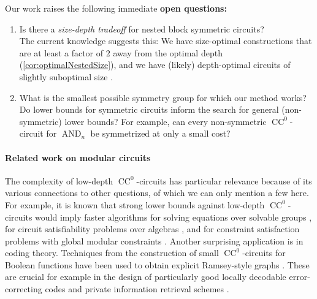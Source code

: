 \documentclass[11pt]{article}
\DeclareMathOperator{\AND}{AND}
\theoremstyle{definition}
\theoremstyle{plain}
\theoremstyle{remark}
\theoremstyle{remark}
\DeclareMathOperator{\CC}{CC}
\begin{document}
Our work raises the following immediate \textbf{open questions:}\\
\vspace*{-1em}
\begin{enumerate}
	\item Is there a \emph{size-depth tradeoff} for nested block symmetric circuits?\\ The current knowledge suggests this: We have size-optimal constructions that are at least a factor of $2$ away from the optimal depth (\cref{cor:optimalNestedSize}), and we have (likely) depth-optimal circuits of slightly suboptimal size \cite[Proposition 4.3]{IdziakKK22LICS}.
	\item What is the smallest possible symmetry group for which our method works? Do lower bounds for symmetric circuits inform the search for general (non-symmetric) lower bounds? For example, can every non-symmetric $\CC^0$-circuit for $\AND_n$ be symmetrized at only a small cost?
\end{enumerate}	





 







\paragraph*{Related work on modular circuits }
The complexity of low-depth $\CC^0$-circuits has particular relevance because of its various connections to other questions, of which we can only mention a few here.
For example, it is known that strong lower bounds against low-depth $\CC^0$-circuits would imply faster algorithms for solving equations over solvable groups \cite{IdziakKKW22-icalp}, for circuit satisfiability problems over algebras \cite{IdziakKK20, IdziakKK25}, and for constraint satisfaction problems with global modular constraints \cite{brakensiek2022}.
Another surprising application is in coding theory. Techniques from the construction of small $\CC^0$-circuits for Boolean functions have been used to obtain explicit Ramsey-style graphs \cite{Gopalan14, grolmusz2000}. These are crucial for example in the design of particularly good locally decodable error-correcting codes \cite{Efremenko12, zev11} and private information retrieval schemes \cite{zeev15}. 
\end{document}
